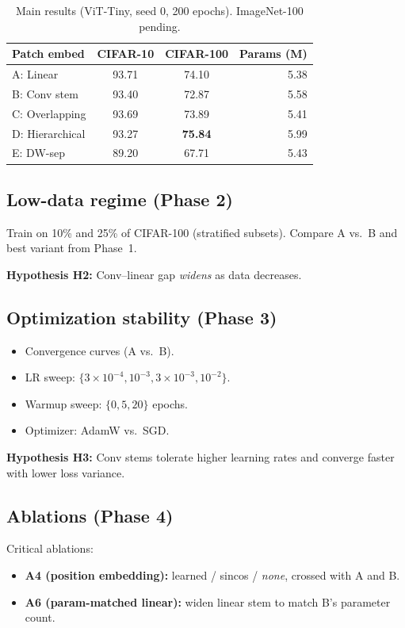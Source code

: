 \documentclass[10pt,twocolumn]{article}
\begin{document}
\begin{table}[t]
\centering
\caption{Main results (ViT-Tiny, seed 0, 200 epochs). ImageNet-100 pending.}
\label{tab:main}
\begin{tabular}{lccr}
\toprule
Patch embed & CIFAR-10 & CIFAR-100 & Params (M) \\
\midrule
A: Linear      & 93.71 & 74.10 & 5.38 \\
B: Conv stem   & 93.40 & 72.87 & 5.58 \\
C: Overlapping & 93.69 & 73.89 & 5.41 \\
D: Hierarchical& 93.27 & \textbf{75.84} & 5.99 \\
E: DW-sep      & 89.20 & 67.71 & 5.43 \\
\bottomrule
\end{tabular}
\end{table}

\subsection{Low-data regime (Phase 2)}

Train on 10\% and 25\% of CIFAR-100 (stratified subsets).
Compare A vs.\ B and best variant from Phase~1.

\textbf{Hypothesis H2:} Conv--linear gap \emph{widens} as data decreases.

\subsection{Optimization stability (Phase 3)}

\begin{itemize}
  \item Convergence curves (A vs.\ B).
  \item LR sweep: $\{3{\times}10^{-4}, 10^{-3}, 3{\times}10^{-3}, 10^{-2}\}$.
  \item Warmup sweep: $\{0, 5, 20\}$ epochs.
  \item Optimizer: AdamW vs.\ SGD.
\end{itemize}

\textbf{Hypothesis H3:} Conv stems tolerate higher learning rates and converge faster with lower loss variance.

\subsection{Ablations (Phase 4)}

Critical ablations:
\begin{itemize}
  \item \textbf{A4 (position embedding):} learned / sincos / \emph{none}, crossed with A and B.
  \item \textbf{A6 (param-matched linear):} widen linear stem to match B's parameter count.
\end{itemize}
\end{document}
